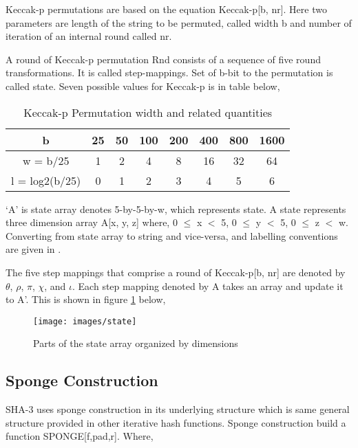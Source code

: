 Keccak-p permutations are based on the equation Keccak-p[b, nr]. Here two parameters are length of the string to be permuted, called width b and number of iteration of an internal round called nr. \par

A round of Keccak-p permutation Rnd consists of a sequence of five round transformations. It is called step-mappings. Set of b-bit to the permutation is called state. Seven possible values for Keccak-p is in table below,

\begin{table}[ht]
	\centering
	
\begin{tabular}{|c||c|c|c|c|c|c|c|} 
\hline
 b & 25 & 50 & 100 & 200 & 400 & 800 & 1600 \\ \hline
 w = b/25 & 1 & 2 & 4 & 8 & 16 & 32 &64 \\ \hline
 l = log2(b/25) & 0 & 1 & 2 & 3 & 4 & 5 & 6 \\ \hline
\end{tabular}
\caption{Keccak-p Permutation width and related quantities}
\label{table:2}
\end{table}

‘A’ is state array denotes 5-by-5-by-w, which represents state. A state represents three dimension array A[x, y, z] where, 0 $\leq$ x $<$ 5, 0 $\leq$ y $<$ 5, 0 $\leq$ z $<$ w. Converting from state array to string and vice-versa, and labelling conventions are given in \cite{fips202}. \par

The five step mappings that comprise a round of Keccak-p[b, nr] are denoted by $\theta$, $\rho$, $\pi$, $\chi$, and $\iota$. Each step mapping denoted by A takes an array and update it to A’. This is shown in figure \ref{state} below,

\begin{figure}[ht]
	\centering
	\texttt{[image: images/state]}
	\caption{Parts of the state array organized by dimensions \label{state}}
\end{figure}


\subsection{Sponge Construction}

SHA-3 uses sponge construction in its underlying structure which is same general structure provided in other iterative hash functions. Sponge construction build a function SPONGE[f,pad,r]. Where,

